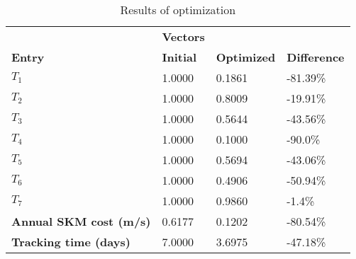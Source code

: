 \begin{table}[H]
\centering
\begin{tabular}{llll}
\textbf{}      & \cellcolor[HTML]{EFEFEF}\textbf{Vectors} & \textbf{} & \textbf{}         \\
\rowcolor[HTML]{EFEFEF} 
\textbf{Entry} & \textbf{Initial} & \textbf{Optimized} & \textbf{Difference} \\
$T_1$ & 1.0000 & 0.1861 & -81.39\% \\ 
$T_2$ & 1.0000 & 0.8009 & -19.91\% \\ 
$T_3$ & 1.0000 & 0.5644 & -43.56\% \\ 
$T_4$ & 1.0000 & 0.1000 & -90.0\% \\ 
$T_5$ & 1.0000 & 0.5694 & -43.06\% \\ 
$T_6$ & 1.0000 & 0.4906 & -50.94\% \\ 
$T_7$ & 1.0000 & 0.9860 & -1.4\% \\ 
\rowcolor[HTML]{EFEFEF} 
\textbf{Annual SKM cost (m/s)}  & 0.6177 & 0.1202 & -80.54\% \\ 
\rowcolor[HTML]{EFEFEF} 
\textbf{Tracking time (days)}  & 7.0000 & 3.6975 & -47.18\% \\ 
\end{tabular}
\caption{Results of optimization}
\label{tab:OptimizationAnalysis}
\end{table}